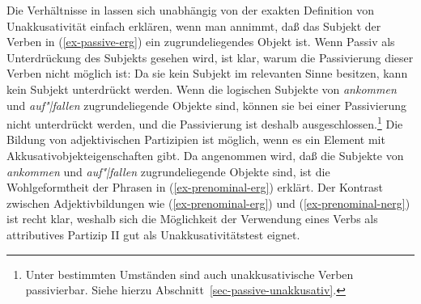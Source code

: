Die Verhältnisse in  lassen sich unabhängig von
der exakten Definition von Unakkusativität einfach erklären, wenn man annimmt,
daß das Subjekt der Verben in (\ref{ex-passive-erg}) ein zugrundeliegendes Objekt ist.
Wenn Passiv als Unterdrückung des Subjekts gesehen wird, ist klar, warum die Passivierung dieser
Verben nicht möglich ist: Da sie kein Subjekt im relevanten Sinne besitzen, kann kein Subjekt
unterdrückt werden. Wenn die logischen Subjekte von \emph{ankommen} und \emph{auf"|fallen}
zugrundeliegende Objekte sind, können sie bei einer Passivierung nicht unterdrückt werden,
und die Passivierung ist deshalb ausgeschlossen.\footnote{
        Unter bestimmten Umständen sind auch unakkusativische Verben
        passivierbar. Siehe hierzu Abschnitt~\ref{sec-passive-unakkusativ}.
}
Die Bildung von adjektivischen Partizipien ist möglich, wenn es ein Element mit
Akkusativobjekteigenschaften gibt. Da angenommen wird, daß die Subjekte
von \emph{ankommen} und \emph{auf"|fallen} zugrundeliegende Objekte sind,
ist die Wohlgeformtheit der Phrasen in (\ref{ex-prenominal-erg}) erklärt. Der Kontrast zwischen
Adjektivbildungen wie (\ref{ex-prenominal-erg}) und (\ref{ex-prenominal-nerg}) ist recht klar,
weshalb sich die Möglichkeit der Verwendung eines Verbs als attributives Partizip II gut als
Unakkusativitätstest eignet.%


